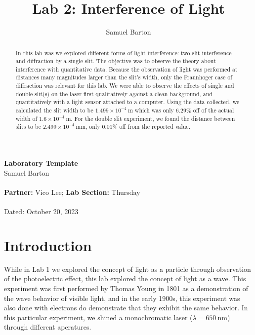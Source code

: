 \documentclass{article}[12pt]
\begin{document}
\title{Lab 2: Interference of Light}
\author{Samuel Barton}


\begin{center}
\large{\textbf{Laboratory Template}}\\
\bigskip
\small{Samuel Barton}\\
~\\
\small{\textbf{Partner:} Vico Lee; \textbf{Lab Section:} Thursday }\\
~\\
Dated: October 20, 2023\\

\end{center}

\bigskip
\begin{abstract}
  In this lab was we explored different forms of light interference: two-slit interference and diffraction by a single slit. 
  The objective was to observe the theory about interference with quantitative data.
  Because the observation of light was performed at distances many magnitudes larger than the slit's width, only the Fraunhoger case of diffraction was relevant for this lab.
  We were able to observe the effects of single and double slit(s) on the laser first qualitatively against a clean background, and quantitatively with a light sensor attached to a computer.
  Using the data collected, we calculated the slit width to be $ 1.499\times 10^{-4}~\mathrm{m}$ which was only $ 6.29\% $ off of the actual width of $ 1.6\times 10^{-4}~\mathrm{m}$.
  For the double slit experiment, we found the distance between slits to be $ 2.499 \times 10^{-4}~\mathrm{mm} $, only $ 0.01\% $ off from the reported value.

\end{abstract}
\bigskip

\section{Introduction}

While in Lab 1 we explored the concept of light as a particle through observation of the photoelectric effect, this lab explored the concept of light as a wave.
This experiment was first performed by Thomas Young in 1801 as a demonstration of the wave behavior of visible light, and in the early 1900s, this experiment was also done with electrons do demonstrate that they exhibit the same behavior.
In this particular experiment, we shined a monochromatic laser ($ \lambda =650~\mathrm{nm} $) through different aperatures.
\end{document}
